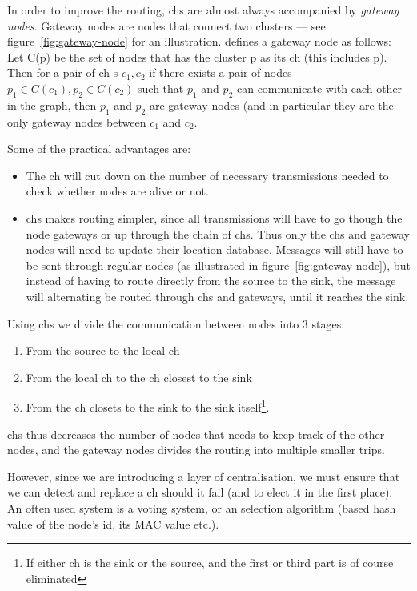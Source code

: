 In order to improve the routing, \acp{ch} are almost always accompanied by \emph{gateway nodes}. Gateway nodes are nodes that connect two clusters --- see figure~\ref{fig:gateway-node} for an illustration. \cite{spanners} defines a gateway node as follows:
Let C(p) be the set of nodes that has the cluster p as its \ac{ch} (this includes p). Then for a pair of \ac{ch} s $c_1, c_2$ if there exists a pair of nodes $p_1 \in C(c_1), p_2 \in C(c_2)$ such that $p_1$ and $p_2$ can communicate with each other in the graph, then $p_1$ and $p_2$ are gateway nodes (and in particular they are the only gateway nodes between $c_1$ and $c_2$.  

Some of the practical advantages are:
\begin{itemize}
\item The \ac{ch} will cut down on the number of necessary transmissions needed to check whether nodes are alive or not.
\item \acp{ch} makes routing simpler, since all transmissions will have to go though the node gateways or up through the chain of \acp{ch}. Thus only the \acp{ch} and gateway nodes will need to update their location database. Messages will still have to be sent through regular nodes (as illustrated in figure~\ref{fig:gateway-node}), but instead of having to route directly from the source to the sink, the message will alternating be routed through \acp{ch} and gateways, until it reaches the sink.
\end{itemize}

Using \acp{ch} we divide the communication between nodes into 3 stages:
\begin{enumerate}
\item From the source to the local \ac{ch} 
\item From the local \ac{ch} to the \ac{ch} closest to the sink
\item From the \ac{ch} closets to the sink to the sink itself\footnote{If either \ac{ch} is the sink or the source, and the first or third part is of course eliminated}.
\end{enumerate}
 \acp{ch} thus decreases the number of nodes that needs to keep track of the other nodes, and the gateway nodes divides the routing into multiple smaller trips.  

However, since we are introducing a layer of centralisation, we must ensure that we can detect and replace a \ac{ch} should it fail (and to elect it in the first place). An often used system is a voting system, or an selection algorithm (based hash value of the node's id, its MAC value etc.).

